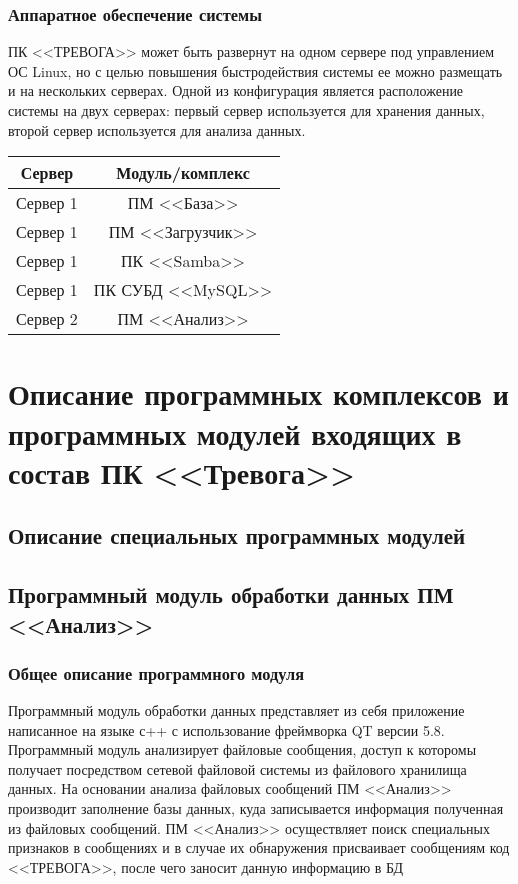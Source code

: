 \documentclass[12pt]{article}[a4paper,14pt,russian]
\begin{document}
	\subsubsection{Аппаратное обеспечение системы}
	ПК <<ТРЕВОГА>> может быть развернут на одном сервере под управлением ОС Linux, но с целью повышения быстродействия системы ее можно размещать и на нескольких серверах. Одной из конфигурация является расположение системы на двух серверах:
	первый сервер используется для хранения данных, второй сервер используется для анализа данных. 
	\begin{tabular}{|c|c|}
		\hline
		Сервер & Модуль/комплекс  \\
		\hline
		Сервер 1 & ПМ <<База>> \\
		Сервер 1 & ПМ <<Загрузчик>> \\
		Сервер 1 & ПК <<Samba>> \\
		Сервер 1 & ПК СУБД <<MySQL>> \\
		Сервер 2 & ПМ <<Анализ>> \\
		
	\end{tabular}
	\section{Описание программных комплексов и программных модулей входящих в состав ПК <<Тревога>>}
	\subsection{Описание специальных программных модулей}
	\subsection{Программный модуль обработки данных ПМ <<Анализ>>}
	\subsubsection{Общее описание программного модуля}
	Программный модуль обработки данных представляет из себя приложение написанное на
	языке с++ с использование фреймворка QT версии 5.8. Программный модуль анализирует файловые сообщения, доступ к которомы получает посредством сетевой файловой системы из файлового хранилища данных. На основании анализа файловых сообщений ПМ <<Анализ>> производит заполнение базы данных, куда записывается информация полученная из файловых сообщений. ПМ <<Анализ>> осуществляет поиск специальных признаков в сообщениях и в случае их обнаружения присваивает сообщениям код <<ТРЕВОГА>>, после чего заносит данную информацию в БД
	
\end{document}
